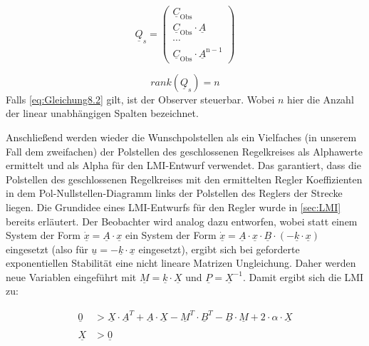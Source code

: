 \begin{equation} \label{eq:Gleichung8.1}
    \underline{Q}_s = \begin{pmatrix} \underline{C}_{\mathrm{Obs}} \\ \underline{C}_{\mathrm{Obs}} \cdot \underline{A} \\ \cdots \\  \underline{C}_{\mathrm{Obs}} \cdot \underline{A}^{\mathrm{n-1}} \end{pmatrix}
\end{equation}

\begin{equation} \label{eq:Gleichung8.2}
    rank(\underline{Q}_s) = n
\end{equation}
\newline
Falls \autoref{eq:Gleichung8.2} gilt, ist der Observer steuerbar. Wobei $n$ hier die Anzahl der linear unabhängigen Spalten bezeichnet.

Anschließend werden wieder die Wunschpolstellen als ein Vielfaches (in unserem Fall dem zweifachen) der Polstellen des geschlossenen Regelkreises als Alphawerte ermittelt und als Alpha für den LMI-Entwurf verwendet. Das garantiert, dass die Polstellen des geschlossenen Regelkreises mit den ermittelten Regler Koeffizienten in dem Pol-Nullstellen-Diagramm links der Polstellen des Reglers der Strecke liegen.
Die Grundidee eines LMI-Entwurfs für den Regler wurde in \autoref{sec:LMI} bereits erläutert. Der Beobachter wird analog dazu entworfen, wobei statt einem System der Form $\dot{\underline{x}} = \underline{A} \cdot \underline{x}$ ein System der Form $\dot{\underline{x}} = \underline{A}\cdot \underline{x} \cdot \underline{B}\cdot (-\underline{k}\cdot \underline{x})$ eingesetzt (also für $\underline{u} = -\underline{k} \cdot \underline{x}$ eingesetzt), ergibt sich bei geforderte exponentiellen Stabilität eine nicht lineare Matrizen Ungleichung. Daher werden neue Variablen eingeführt mit $\underline{M} = \underline{k} \cdot \underline{X}$ und $\underline{P} = \underline{X}^{-1}$. Damit ergibt sich die LMI zu:

\begin{equation}
    \begin{split}
        \underline{0} &> \underline{X} \cdot \underline{A}^T + \underline{A} \cdot \underline{X} - \underline{M}^T \cdot \underline{B}^T - \underline{B} \cdot \underline{M} + 2 \cdot \alpha \cdot \underline{X}\\\\
        \underline{X} &> \underline{0}
    \end{split}
    \label{eq:Gleichung8.3}
\end{equation}
\newline

